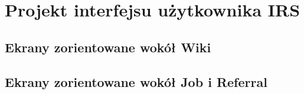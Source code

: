 \documentclass{scrreprt}
\begin{document}
\chapter{Projekt interfejsu użytkownika IRS}

\section{Ekrany zorientowane wokół Wiki}
\begin{center}
\end{center}

\section{Ekrany zorientowane wokół Job i Referral}
\begin{center}
\end{center}
\end{document}
